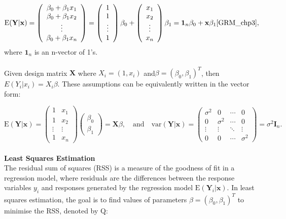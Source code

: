 \documentclass{article}\usepackage[]{graphicx}\usepackage[]{xcolor}
\begin{document}
$$\mathrm{E}(\mathbf{Y} | \mathbf{x}) =
\left( \begin{array}{ccc}
\beta_0+\beta_1 x_1\\
\beta_0+\beta_1 x_2\\
\vdots\\
\beta_0+\beta_1 x_n
\end{array} \right) = 
\left( \begin{array}{ccc}
1\\
1\\
\vdots\\
1
\end{array} \right) \beta_0 + 
\left( \begin{array}{ccc}
x_1\\
x_2\\
\vdots\\
x_n
\end{array} \right) \beta_1 =
\mathbf{1}_n \beta_0 + \mathbf{x} \beta_1 \cite{GRM_chp3},
$$ 
\noindent
where $\mathbf{1}_n$ is an n-vector of 1's.
\\  
\\Given design matrix $\mathbf{X}$ where $X_i = (1, x_i)$ and$\beta = (\beta_0, \beta_1)^T$, then $E(Y_i|x_i) = X_i \beta$. These assumptions can be equivalently written in the vector form:

\[\mathrm{E}(\mathbf{Y} | \mathbf{x}) = 
\left( \begin{array}{cc}
1 & x_1\\
1 & x_2\\
\vdots& \vdots\\
1 & x_n
\end{array} \right) 
\left( \begin{array}{cc}
\beta_0 \\
\beta_1
\end{array} \right) = \mathbf{X} \beta, \quad \text{and} \quad
\text{var}(\mathbf{Y} | \mathbf{x}) =
\begin{pmatrix}
\sigma^2 & 0 & \cdots & 0 \\
0 & \sigma^2 & \cdots & 0 \\
\vdots & \vdots & \ddots & \vdots \\
0 & 0 & \cdots & \sigma^2
\end{pmatrix} = \sigma^2 \mathbf{I}_n.
\]
\\  
\noindent
\textbf{Least Squares Estimation}\\

\noindent
The residual sum of squares (RSS) is a measure of the goodness of fit in a regression model, where residuals are the differences between the response variables $y_i$ and responses generated by the regression model $\mathrm{E}(\mathbf{Y}_i | \mathbf{x})$. In least squares estimation, the goal is to find values of parameters $\beta = (\beta_0, \beta_1)^T$ to minimise the RSS, denoted by $\mathrm{Q}$: 
\end{document}
